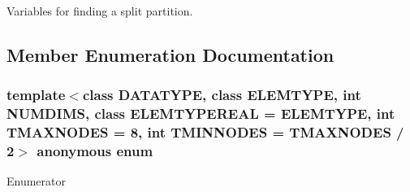 Variables for finding a split partition. 

\subsection{Member Enumeration Documentation}
\hypertarget{structRTree_1_1PartitionVars_aa4395bc76d345f0a081c164bf68d4744}{\subsubsection[{anonymous enum}]{\setlength{\rightskip}{0pt plus 5cm}template$<$class D\-A\-T\-A\-T\-Y\-P\-E, class E\-L\-E\-M\-T\-Y\-P\-E, int N\-U\-M\-D\-I\-M\-S, class E\-L\-E\-M\-T\-Y\-P\-E\-R\-E\-A\-L = E\-L\-E\-M\-T\-Y\-P\-E, int T\-M\-A\-X\-N\-O\-D\-E\-S = 8, int T\-M\-I\-N\-N\-O\-D\-E\-S = T\-M\-A\-X\-N\-O\-D\-E\-S / 2$>$ anonymous enum}}\label{structRTree_1_1PartitionVars_aa4395bc76d345f0a081c164bf68d4744}
\begin{Desc}
\item[Enumerator]\par
\begin{description}
\item[{\em 
\hypertarget{structRTree_1_1PartitionVars_aa4395bc76d345f0a081c164bf68d4744acff1a730449e4b3de500024b4b6b6175}{N\-O\-T\-\_\-\-T\-A\-K\-E\-N}\label{structRTree_1_1PartitionVars_aa4395bc76d345f0a081c164bf68d4744acff1a730449e4b3de500024b4b6b6175}
}]\end{description}
\end{Desc}


